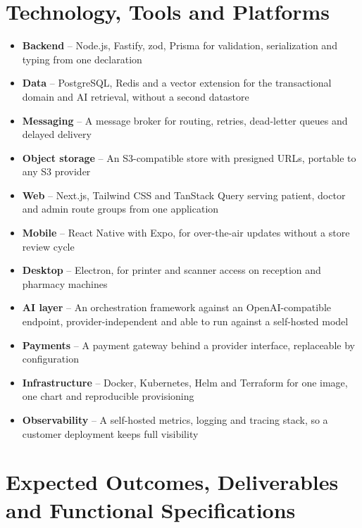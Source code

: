 \documentclass[12pt,a4paper]{article}
\begin{document}
\section{Technology, Tools and Platforms}

\begin{itemize}
  \item \textbf{Backend} -- Node.js, Fastify, zod, Prisma for validation, serialization and typing from one declaration
  \item \textbf{Data} -- PostgreSQL, Redis and a vector extension for the transactional domain and AI retrieval, without a second datastore
  \item \textbf{Messaging} -- A message broker for routing, retries, dead-letter queues and delayed delivery
  \item \textbf{Object storage} -- An S3-compatible store with presigned URLs, portable to any S3 provider
  \item \textbf{Web} -- Next.js, Tailwind CSS and TanStack Query serving patient, doctor and admin route groups from one application
  \item \textbf{Mobile} -- React Native with Expo, for over-the-air updates without a store review cycle
  \item \textbf{Desktop} -- Electron, for printer and scanner access on reception and pharmacy machines
  \item \textbf{AI layer} -- An orchestration framework against an OpenAI-compatible endpoint, provider-independent and able to run against a self-hosted model
  \item \textbf{Payments} -- A payment gateway behind a provider interface, replaceable by configuration
  \item \textbf{Infrastructure} -- Docker, Kubernetes, Helm and Terraform for one image, one chart and reproducible provisioning
  \item \textbf{Observability} -- A self-hosted metrics, logging and tracing stack, so a customer deployment keeps full visibility
\end{itemize}

\clearpage
\section{Expected Outcomes, Deliverables and Functional Specifications}
\end{document}
